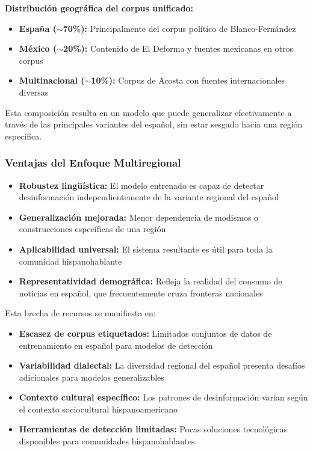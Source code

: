 \textbf{Distribución geográfica del corpus unificado:}
\begin{itemize}
    \item \textbf{España ($\sim$70\%):} Principalmente del corpus político de Blanco-Fernández
    \item \textbf{México ($\sim$20\%):} Contenido de El Deforma y fuentes mexicanas en otros corpus
    \item \textbf{Multinacional ($\sim$10\%):} Corpus de Acosta con fuentes internacionales diversas
\end{itemize}

Esta composición resulta en un modelo que puede generalizar efectivamente a través de las principales variantes del español, sin estar sesgado hacia una región específica.

\subsubsection{Ventajas del Enfoque Multiregional}

\begin{itemize}
    \item \textbf{Robustez lingüística:} El modelo entrenado es capaz de detectar desinformación independientemente de la variante regional del español
    \item \textbf{Generalización mejorada:} Menor dependencia de modismos o construcciones específicas de una región
    \item \textbf{Aplicabilidad universal:} El sistema resultante es útil para toda la comunidad hispanohablante
    \item \textbf{Representatividad demográfica:} Refleja la realidad del consumo de noticias en español, que frecuentemente cruza fronteras nacionales
\end{itemize}

Esta brecha de recursos se manifiesta en:
\begin{itemize}
    \item \textbf{Escasez de corpus etiquetados:} Limitados conjuntos de datos de entrenamiento en español para modelos de detección
    \item \textbf{Variabilidad dialectal:} La diversidad regional del español presenta desafíos adicionales para modelos generalizables
    \item \textbf{Contexto cultural específico:} Los patrones de desinformación varían según el contexto sociocultural hispanoamericano
    \item \textbf{Herramientas de detección limitadas:} Pocas soluciones tecnológicas disponibles para comunidades hispanohablantes
\end{itemize}

